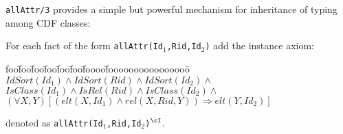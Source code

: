 
{\tt allAttr/3} provides a simple but powerful mechanism for
inheritance of typing among CDF classes:

\begin{instance}  \rm 
For each fact of the form {\tt allAttr(Id$_1$,Rid,Id$_2$)} add the instance
axiom: 
\begin{tabbing}
foo\=foo\=foo\=foo\=foo\=foo\=foooo\=foooooooooooooooo\=\kill
\> $ IdSort(Id_1) \wedge IdSort(Rid) \wedge IdSort(Id_2) \wedge $ \\
\> \> $ IsClass(Id_1) \wedge IsRel(Rid) \wedge IsClass(Id_2) \wedge $ \\
\> \> $(\forall X, Y) [(elt(X,Id_1) \wedge rel(X,Rid,Y))
					\Rightarrow elt(Y,Id_2)] $
\end{tabbing}
denoted as {\tt allAttr(Id$_1$,Rid,Id$_2$)$^{\cI}$}.
\end{instance}

